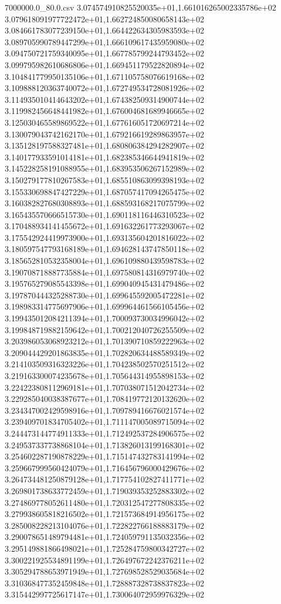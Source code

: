 \begin{filecontents*}{7000000.0_80.0.csv}
3.074574910825520035e+01,1.661016265002335786e+02
3.079618091977722472e+01,1.662724850080658143e+02
3.084661783077239150e+01,1.664422634305983593e+02
3.089705990789447299e+01,1.666109617435959080e+02
3.094750721759340095e+01,1.667785799244793452e+02
3.099795982610686806e+01,1.669451179522820894e+02
3.104841779950135106e+01,1.671105758076619168e+02
3.109888120363740072e+01,1.672749534728081926e+02
3.114935010414643202e+01,1.674382509314900744e+02
3.119982456648441982e+01,1.676004681689946665e+02
3.125030465589869522e+01,1.677616051720697214e+02
3.130079043742162170e+01,1.679216619289863957e+02
3.135128197588327481e+01,1.680806384294282907e+02
3.140177933591014181e+01,1.682385346644941819e+02
3.145228258191088955e+01,1.683953506267152989e+02
3.150279177810267583e+01,1.685510863099398193e+02
3.155330698847427229e+01,1.687057417094265475e+02
3.160382827680308893e+01,1.688593168217075799e+02
3.165435570666515730e+01,1.690118116446310523e+02
3.170488934141455672e+01,1.691632261773293067e+02
3.175542924419973900e+01,1.693135604201816022e+02
3.180597547793168189e+01,1.694628143747850118e+02
3.185652810532358004e+01,1.696109880439598783e+02
3.190708718887735884e+01,1.697580814316979740e+02
3.195765279085543398e+01,1.699040945431479486e+02
3.197870444325288730e+01,1.699645592005472281e+02
3.198983314775697906e+01,1.699964461566105456e+02
3.199435012084211394e+01,1.700093730034996042e+02
3.199848719882159642e+01,1.700212040726255509e+02
3.203986053068923212e+01,1.701390710859222963e+02
3.209044429201863835e+01,1.702820634488589349e+02
3.214103509316323226e+01,1.704238502570251512e+02
3.219163300074235678e+01,1.705644314955898153e+02
3.224223808112969181e+01,1.707038071512042734e+02
3.229285040038387677e+01,1.708419772120132620e+02
3.234347002429598916e+01,1.709789416676021574e+02
3.239409701834705402e+01,1.711147005089715094e+02
3.244473144774911333e+01,1.712492537284906575e+02
3.249537337738868104e+01,1.713826013199168301e+02
3.254602287190878229e+01,1.715147432783141994e+02
3.259667999560424079e+01,1.716456796000429676e+02
3.264734481250879128e+01,1.717754102827411771e+02
3.269801738633772459e+01,1.719039353252883302e+02
3.274869778052611480e+01,1.720312547277808335e+02
3.279938605818216502e+01,1.721573684914956175e+02
3.285008228213104076e+01,1.722822766188883179e+02
3.290078651489794481e+01,1.724059791135032356e+02
3.295149881866498021e+01,1.725284759800342727e+02
3.300221925534891199e+01,1.726497672242376211e+02
3.305294788653971949e+01,1.727698528529035684e+02
3.310368477352459848e+01,1.728887328738837823e+02
3.315442997725617147e+01,1.730064072959976329e+02

\end{filecontents*}
